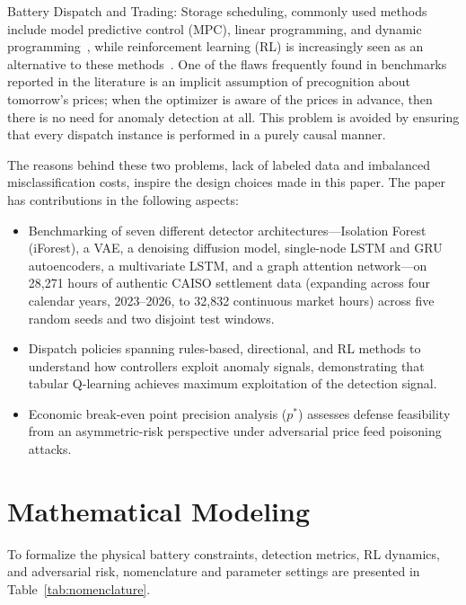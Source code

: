 \documentclass[journal]{IEEEtran}
\begin{document}
Battery Dispatch and Trading: Storage scheduling, commonly used methods include model predictive control (MPC), linear programming, and dynamic programming~\cite{Shi_BESS_Coopt}, while reinforcement learning (RL) is increasingly seen as an alternative to these methods~\cite{RL_Dispatch, Chen_DRL_BESS, Sutton_RL}. One of the flaws frequently found in benchmarks reported in the literature is an implicit assumption of precognition about tomorrow's prices; when the optimizer is aware of the prices in advance, then there is no need for anomaly detection at all. This problem is avoided by ensuring that every dispatch instance is performed in a purely causal manner.

The reasons behind these two problems, lack of labeled data and imbalanced misclassification costs, inspire the design choices made in this paper. The paper has contributions in the following aspects:
\begin{itemize}
\item Benchmarking of seven different detector architectures—Isolation Forest (iForest), a VAE, a denoising diffusion model, single-node LSTM and GRU autoencoders, a multivariate LSTM, and a graph attention network—on 28,271 hours of authentic CAISO settlement data (expanding across four calendar years, 2023--2026, to 32,832 continuous market hours) across five random seeds and two disjoint test windows.
\item Dispatch policies spanning rules-based, directional, and RL methods to understand how controllers exploit anomaly signals, demonstrating that tabular Q-learning achieves maximum exploitation of the detection signal.
\item Economic break-even point precision analysis ($p^*$) assesses defense feasibility from an asymmetric-risk perspective under adversarial price feed poisoning attacks.
\end{itemize}

\section{Mathematical Modeling}
\label{sec:math_model}

To formalize the physical battery constraints, detection metrics, RL dynamics, and adversarial risk, nomenclature and parameter settings are presented in Table~\ref{tab:nomenclature}.
\end{document}
